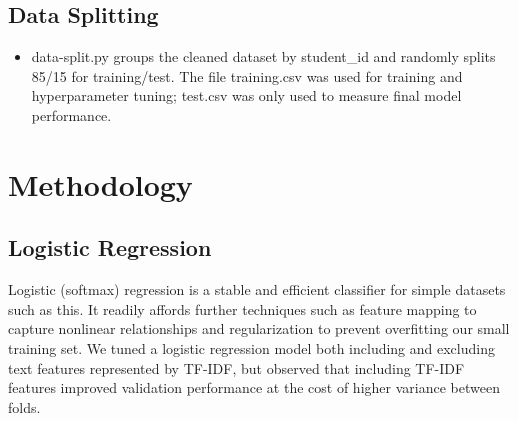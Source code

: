 \documentclass[12pt]{article}
\begin{document}
\subsection{Data Splitting}
\begin{itemize}
  \item data-split.py groups the cleaned dataset by student\_id and randomly splits 85/15 for training/test. The file training.csv was used for training and hyperparameter tuning; test.csv was only used to measure final model performance.
\end{itemize}


\section{Methodology}

\subsection{Logistic Regression}
Logistic (softmax) regression is a stable and efficient classifier for simple datasets such as this. It readily affords further techniques such as feature mapping to capture nonlinear relationships and regularization to prevent overfitting our small training set. We tuned a logistic regression model both including and excluding text features represented by TF-IDF, but observed that including TF-IDF features improved validation performance at the cost of higher variance between folds.
\end{document}

